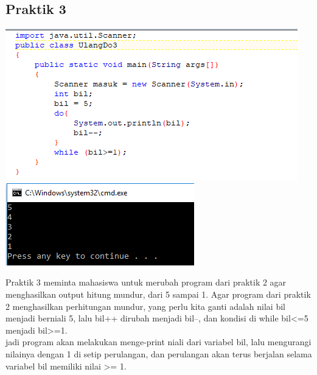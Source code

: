 \documentclass[a4paper,12pt]{article}
\begin{document}
\subsection{Praktik 3}
\begin{center}
	\includegraphics[scale=1]{Capture4}
	\includegraphics[scale=1]{Capture4_2}
\end{center}

Praktik 3 meminta mahasiswa untuk merubah program dari praktik 2 agar menghasilkan output hitung mundur, dari 5 sampai 1.
Agar program dari praktik 2 menghasilkan perhitungan mundur, yang perlu kita ganti adalah nilai bil menjadi berniali 5, lalu bil++ dirubah menjadi bil--, dan kondisi di while bil<=5 menjadi bil>=1.\\
jadi program akan melakukan menge-print niali dari variabel bil, lalu mengurangi nilainya dengan 1 di setip perulangan, dan perulangan akan terus berjalan selama variabel bil memiliki nilai >= 1.
\end{document}
